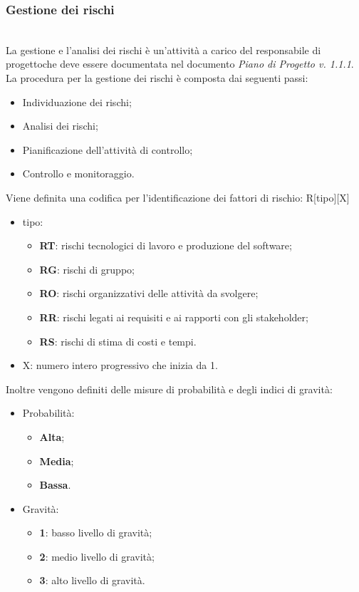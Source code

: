 		\subsubsection{Gestione dei rischi}\mbox{}\\ [1mm]
			La gestione e l'analisi dei rischi è un'attività a carico del responsabile di progetto\glosp che deve essere documentata nel documento \textit{Piano di Progetto v. 1.1.1}.
			La procedura per la gestione dei rischi è composta dai seguenti passi:
			\begin{itemize}
				\item Individuazione dei rischi;
				\item Analisi dei rischi;
				\item Pianificazione dell'attività di controllo;
				\item Controllo e monitoraggio.
			\end{itemize}
			Viene definita una codifica per l'identificazione dei fattori di rischio: R[tipo][X]
			\begin{itemize}
				\item tipo:
				\begin{itemize}
					\item \textbf{RT}: rischi tecnologici di lavoro e produzione del software;
					\item \textbf{RG}: rischi di gruppo;
					\item \textbf{RO}: rischi organizzativi delle attività da svolgere;
					\item \textbf{RR}: rischi legati ai requisiti e ai rapporti con gli stakeholder\glo;
					\item \textbf{RS}: rischi di stima di costi e tempi.
				\end{itemize}
				\item X: numero intero progressivo che inizia da 1.
			\end{itemize}
			Inoltre vengono definiti delle misure di probabilità e degli indici di gravità:
			\begin{itemize}
				\item Probabilità:
				\begin{itemize}
					\item \textbf{Alta};
					\item \textbf{Media};
					\item \textbf{Bassa}.
				\end{itemize}
				\item Gravità:
				\begin{itemize}
					\item \textbf{1}: basso livello di gravità;
					\item \textbf{2}: medio livello di gravità;
					\item \textbf{3}: alto livello di gravità.
				\end{itemize}
			\end{itemize}
